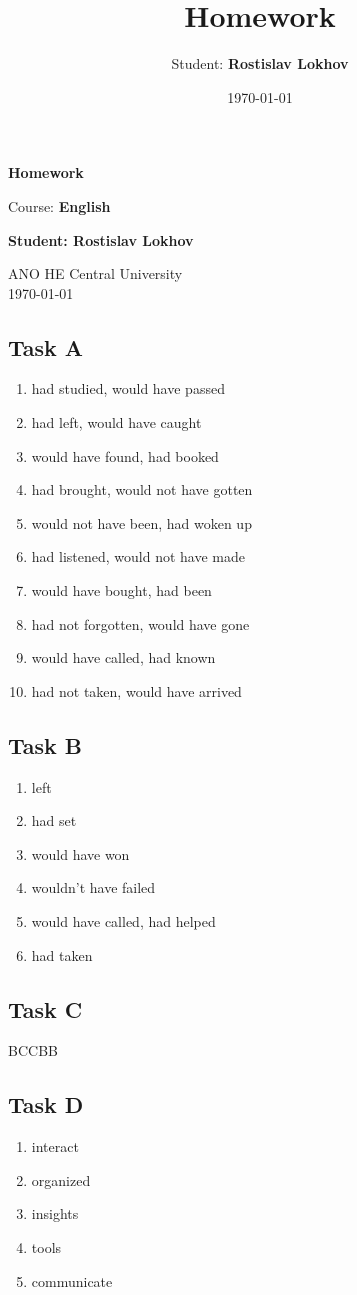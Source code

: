 \documentclass[a4paper,12pt,english]{article}
\title{Homework}
\author{Student: \textbf{Rostislav Lokhov}}
\date{\today}
\begin{document}
\begin{titlepage}
    \centering
    \vspace*{1cm}

    \Huge
    \textbf{Homework}

    \vspace{0.5cm}
    \LARGE
    Course: \textbf{English}

    \vspace{1.5cm}

    \textbf{Student: Rostislav Lokhov}

    \vfill

    \Large
    ANO HE Central University\\
    \vspace{0.3cm}
    \today

\end{titlepage}


\subsection{Task A}
\begin{enumerate}
    \item had studied, would have passed
    \item had left, would have caught
    \item would have found, had booked
    \item had brought, would not have gotten
    \item would not have been, had woken up
    \item had listened, would not have made
    \item would have bought, had been
    \item had not forgotten, would have gone
    \item would have called, had known
    \item had not taken, would have arrived
\end{enumerate}

\subsection{Task B}
\begin{enumerate}
    \item left
    \item had set
    \item would have won
    \item wouldn't have failed
    \item would have called, had helped
    \item had taken
\end{enumerate}

\subsection{Task C}
BCCBB

\subsection{Task D}
\begin{enumerate}
    \item interact
    \item organized
    \item insights
    \item tools
    \item communicate
\end{enumerate}
\end{document}
